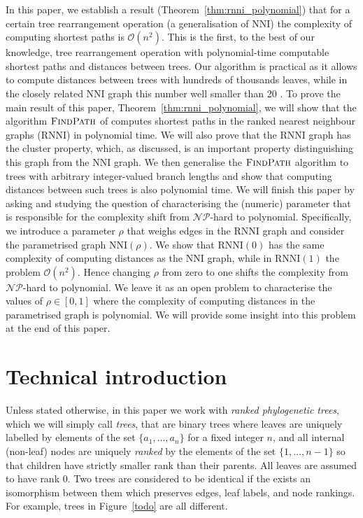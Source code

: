 \documentclass[11pt]{amsart}
\newcommand{\rnni}{\mathrm{RNNI}}
\newcommand{\findpath}{\textsc{FindPath}}
\newcommand{\nni}{\mathrm{NNI}}
\newcommand{\np}{\mathcal{NP}}
\renewcommand{\O}{\mathcal O}
\newcommand{\summary}[1]{} %
\begin{document}
\summary{Paper summary in light of motivation: We've discovered the first efficiently computable distance, given by a parameter range in known tree spaces, and want to understand the reason for the complexity jump -- cite ``Beyond worst-case complexity.''}
In this paper, we establish a result (Theorem~\ref{thm:rnni_polynomial}) that for a certain tree rearrangement operation (a generalisation of $\nni$) the complexity of computing shortest paths is $\O(n^2)$.
This is the first, to the best of our knowledge, tree rearrangement operation with polynomial-time computable shortest paths and distances between trees.
Our algorithm is practical as it allows to compute distances between trees with hundreds of thousands leaves, while in the closely related $\nni$ graph this number well smaller than 20 \autocite{todo}.
To prove the main result of this paper, Theorem~\ref{thm:rnni_polynomial}, we will show that the algorithm $\findpath$ of \textcite{Collienne2019-ca} computes shortest paths in the ranked nearest neighbour graphs ($\rnni$) in polynomial time.
We will also prove that the $\rnni$ graph has the cluster property, which, as discussed, is an important property distinguishing this graph from the $\nni$ graph.
We then generalise the $\findpath$ algorithm to trees with arbitrary integer-valued branch lengths and show that computing distances between such trees is also polynomial time.
We will finish this paper by asking and studying the question of characterising the (numeric) parameter that is responsible for the complexity shift from $\np$-hard to polynomial.
Specifically, we introduce a parameter $\rho$ that weighs edges in the $\rnni$ graph and consider the parametrised graph $\nni(\rho)$.
We show that $\rnni(0)$ has the same complexity of computing distances as the $\nni$ graph, while in $\rnni(1)$ the problem $\O(n^2)$.
Hence changing $\rho$ from zero to one shifts the complexity from $\np$-hard to polynomial.
We leave it as an open problem to characterise the values of $\rho \in [0,1]$ where the complexity of computing distances in the parametrised graph is polynomial.
We will provide some insight into this problem at the end of this paper.


\section{Technical introduction}

\summary{Defining ranked trees and clusters.}
Unless stated otherwise, in this paper we work with \emph{ranked phylogenetic trees}, which we will simply call \emph{trees}, that are binary trees where leaves are uniquely labelled by elements of the set $\{a_1, \ldots, a_n\}$ for a fixed integer $n$, and all internal (non-leaf) nodes are uniquely \emph{ranked} by the elements of the set $\{1, \ldots, n-1\}$ so that children have strictly smaller rank than their parents.
All leaves are assumed to have rank $0$.
Two trees are considered to be identical if the exists an isomorphism between them which preserves edges, leaf labels, and node rankings.
For example, trees in Figure~\ref{todo} are all different.
\end{document}
